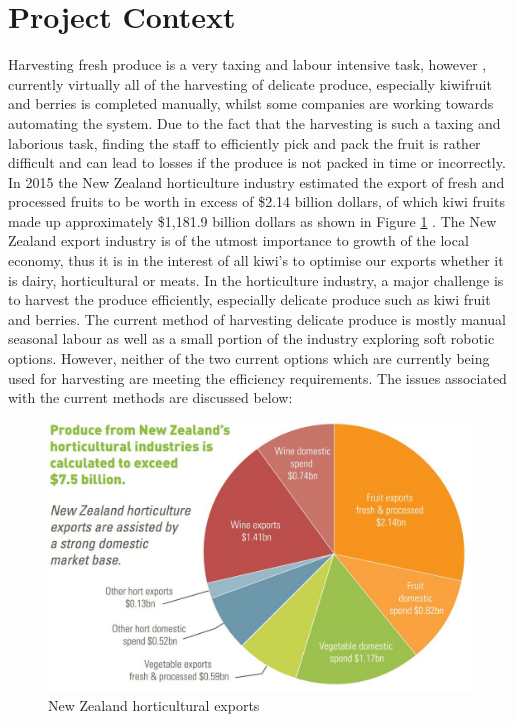 \documentclass[11pt,twocolumn]{article}
\begin{document}
\section{Project Context}
Harvesting fresh produce is a very taxing and labour intensive task, however , currently virtually all of the harvesting of delicate produce, especially kiwifruit and berries is completed manually, whilst some companies are working towards automating the system. Due to the fact that the harvesting is such a taxing and laborious task, finding the staff to efficiently pick and pack the fruit is rather difficult and can lead to losses if the produce is not packed in time or incorrectly. In 2015 the New Zealand horticulture industry estimated the export of fresh and processed fruits to be worth in excess of \$2.14 billion dollars, of which kiwi fruits made up approximately \$1,181.9 billion dollars as shown in Figure \ref{fig:Pie} \cite{fresh_facts_2015}. The New Zealand export industry is of the utmost importance to growth of the local economy, thus it is in the interest of all kiwi's to optimise our exports whether it is dairy, horticultural or meats. In the horticulture industry, a major challenge is to harvest the produce efficiently, especially delicate produce such as kiwi fruit and berries. The current method of harvesting delicate produce is mostly manual seasonal labour as well as a small portion of the industry exploring soft robotic options. However, neither of the two current options which are currently being used for harvesting are meeting the efficiency requirements. The issues associated with the current methods are discussed below:
\begin{figure}[h]
\centering
\includegraphics[scale=0.37]{pie_imports}
\caption{New Zealand horticultural exports}
\label{fig:Pie}
\end{figure}
\end{document}
